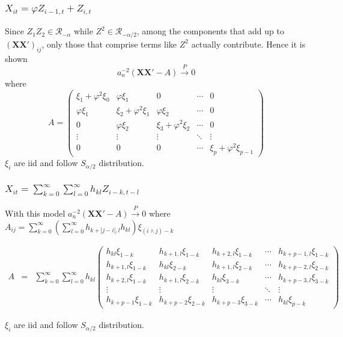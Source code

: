\documentclass{beamer}
\begin{document}
\begin{frame}
  \frametitle{$X_{it} = \varphi Z_{i-1, t} + Z_{i,t}$}
  Since $Z_1Z_2 \in \mathcal R_{-\alpha}$ while $Z^2 \in \mathcal
  R_{-\alpha/2}$, among the components that add up to $(\mathbf{XX'})_{ij}$, only those
  that comprise terms like $Z^2$ actually contribute. Hence it is shown
  $$
  a_n^{-2} (\mathbf{XX'} - A) \overset{P}{\to} 0
  $$
  where
  \[
  A =
  \begin{pmatrix}
    \xi_1 + \varphi^2 \xi_0 & \varphi \xi_1 & 0 & \cdots & 0 \\
    \varphi \xi_1 & \xi_2 + \varphi^2 \xi_1 & \varphi \xi_2 & \cdots & 0 \\
    0 & \varphi \xi_2 & \xi_3 + \varphi^2 \xi_2 & \cdots & 0 \\
    \vdots & \vdots & \vdots & \ddots & \vdots \\
    0 & 0 & 0 & \cdots & \xi_p + \varphi^2 \xi_{p-1}
  \end{pmatrix}
  \]
  $\xi_i$ are iid and follow $S_{\alpha/2}$ distribution.
\end{frame}

\begin{frame}
  \frametitle{$X_{it} = \sum_{k=0}^\infty \sum_{l=0}^\infty h_{kl}
    Z_{i-k,t-l}$}
  With this model $a_n^{-2}(\mathbf{XX'} - A) \overset{P}{\to} 0$ where
  $A_{ij} = \sum_{k=0}^\infty \left(\sum_{l=0}^\infty h_{k+|j-i|,l}
    h_{kl}\right)\xi_{(i \wedge j) -k}$
  \begin{scriptsize}
    \begin{eqnarray*}
      A &=& \sum_{k=0}^\infty \sum_{l=0}^\infty h_{kl}
      \begin{pmatrix}
        h_{kl} \xi_{1-k} & 
        h_{k+1,l} \xi_{1-k} & 
        h_{k+2,l} \xi_{1-k} & \cdots & h_{k+p-1,l}
        \xi_{1-k}\\
        h_{k+1,l} \xi_{1-k} &
        h_{kl} \xi_{2-k} & 
        h_{k+1,l} \xi_{2-k} & \cdots & h_{k+p-2,l}
        \xi_{2-k}\\
        h_{k+2,l} \xi_{1-k} &
        h_{k+1,l} \xi_{2-k} & 
        h_{kl} \xi_{3-k} & \cdots &
        h_{k+p-3,l} \xi_{3-k}\\
        \vdots & \vdots & \vdots & \ddots & \vdots \\
        h_{k+p-1} \xi_{1-k} & h_{k+p-2} \xi_{2-k} &
        h_{k+p-3} \xi_{3-k} & \cdots & h_{kl} \xi_{p-k}
      \end{pmatrix}
    \end{eqnarray*}
  \end{scriptsize}
  $\xi_i$ are iid and follow $S_{\alpha/2}$ distribution.
\end{frame}
\end{document}
